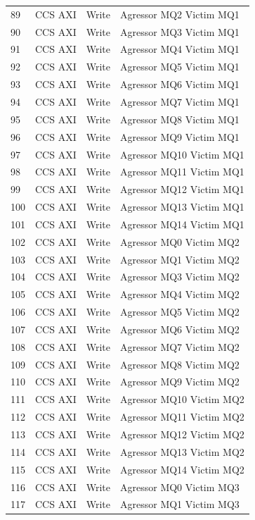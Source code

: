 \begin{center}
\begin{longtable}{|l|l|l|l|}
89 & CCS AXI & Write &  Agressor MQ2 Victim MQ1\\
90 & CCS AXI & Write &  Agressor MQ3 Victim MQ1\\
91 & CCS AXI & Write &  Agressor MQ4 Victim MQ1\\
92 & CCS AXI & Write &  Agressor MQ5 Victim MQ1\\
93 & CCS AXI & Write &  Agressor MQ6 Victim MQ1\\
94 & CCS AXI & Write &  Agressor MQ7 Victim MQ1\\
95 & CCS AXI & Write &  Agressor MQ8 Victim MQ1\\
96 & CCS AXI & Write &  Agressor MQ9 Victim MQ1\\
97 & CCS AXI & Write &  Agressor MQ10 Victim MQ1\\
98 & CCS AXI & Write &  Agressor MQ11 Victim MQ1\\
99 & CCS AXI & Write &  Agressor MQ12 Victim MQ1\\
100 & CCS AXI & Write &  Agressor MQ13 Victim MQ1\\
101 & CCS AXI & Write &  Agressor MQ14 Victim MQ1\\
102 & CCS AXI & Write &  Agressor MQ0 Victim MQ2\\
103 & CCS AXI & Write &  Agressor MQ1 Victim MQ2\\
104 & CCS AXI & Write &  Agressor MQ3 Victim MQ2\\
105 & CCS AXI & Write &  Agressor MQ4 Victim MQ2\\
106 & CCS AXI & Write &  Agressor MQ5 Victim MQ2\\
107 & CCS AXI & Write &  Agressor MQ6 Victim MQ2\\
108 & CCS AXI & Write &  Agressor MQ7 Victim MQ2\\
109 & CCS AXI & Write &  Agressor MQ8 Victim MQ2\\
110 & CCS AXI & Write &  Agressor MQ9 Victim MQ2\\
111 & CCS AXI & Write &  Agressor MQ10 Victim MQ2\\
112 & CCS AXI & Write &  Agressor MQ11 Victim MQ2\\
113 & CCS AXI & Write &  Agressor MQ12 Victim MQ2\\
114 & CCS AXI & Write &  Agressor MQ13 Victim MQ2\\
115 & CCS AXI & Write &  Agressor MQ14 Victim MQ2\\
116 & CCS AXI & Write &  Agressor MQ0 Victim MQ3\\
117 & CCS AXI & Write &  Agressor MQ1 Victim MQ3\\

\end{longtable}
\end{center}
